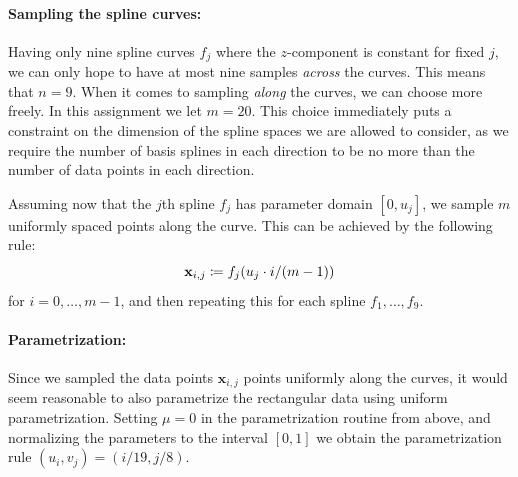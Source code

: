 \documentclass[article]{memoir}
\newcommand{\x}{\mathbf{x}}
\begin{document}
\paragraph{Sampling the spline curves:}

Having only nine spline curves \( f_j \) where the \( z \)-component is
constant for fixed \( j \), we can only hope to have at most nine samples
\emph{across} the curves. This means that \( n = 9\). When it comes to sampling
\emph{along} the curves, we can choose more freely. In this assignment we let
\( m = 20 \). This choice immediately puts a constraint on the dimension of the
spline spaces we are allowed to consider, as we require the number of basis
splines in each direction to be no more than the number of data points in each
direction.

Assuming now that the \(j\)th spline \( f_j \) has parameter domain \([0,
u_j]\), we sample \( m \) uniformly spaced points along the curve. This can be
achieved by the following rule:
\begin{equation}
    \notag
    \x_{i, j} \coloneqq f_j(u_j \cdot i / (m - 1))
\end{equation}
for \(i = 0, \dots, m-1\), and then repeating this for each spline \(f_1,
\dots, f_9\).

\paragraph{Parametrization:}

Since we sampled the data points \( \x_{i, j} \) points uniformly along the
curves, it would seem reasonable to also parametrize the rectangular data using
uniform parametrization. Setting \( \mu = 0 \) in the parametrization routine
from above, and normalizing the parameters to the interval \([0, 1]\) we obtain
the parametrization rule \((u_i, v_j) = (i / 19, j / 8)\).
\end{document}
